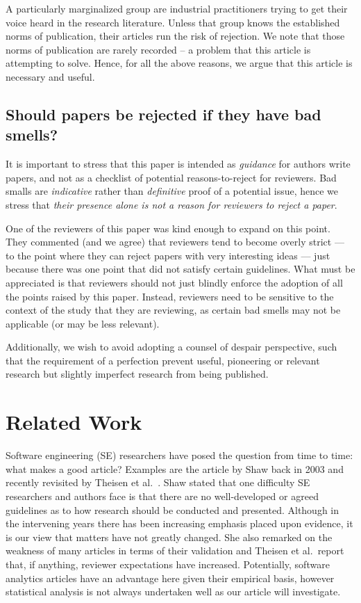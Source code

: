 \documentclass[preprint,10pt]{elsarticle}
\newcommand{\RED}{\color{red}}
\newcommand{\BLACK}{\color{black}}
\begin{document}
A particularly marginalized group are industrial practitioners trying to get their voice heard in the research literature.  Unless that group knows the established norms of publication, their articles run the risk of rejection. We note that those norms of publication are rarely recorded -- a problem that this article is attempting to solve.  Hence, for all the above reasons, we argue that this article is necessary and useful.

\RED \subsection{Should papers be rejected if they have bad smells?}\label{sec:reject}

It is important to stress that this paper is intended as \textit{guidance} for authors  write papers, and not as a checklist of potential reasons-to-reject for reviewers.  Bad smalls are {\em indicative} rather than {\em definitive} proof of a potential issue, hence we stress that {\em their presence alone is not a reason for reviewers to reject a paper}. 

One of the reviewers of this paper was kind enough to expand on this point. They commented (and we agree) that reviewers tend to become overly strict --- to the point where they can reject papers with very interesting ideas --- just because there was one point that did not satisfy certain guidelines.  What must be  appreciated is that reviewers should not just blindly enforce the adoption of all the points raised by this paper. Instead, reviewers need to be sensitive to the context of the study that they are reviewing, as certain bad smells may not be applicable (or may be less relevant).  

Additionally, we wish to avoid adopting a counsel of despair perspective, such that the requirement of a perfection prevent useful, pioneering or relevant research but slightly imperfect research from being published.
\BLACK
 

\section{Related Work}\label{Sec:RelWk}
 
Software engineering (SE) researchers have posed the question from time to time: what makes a good article?  Examples are the article by Shaw \cite{Shaw03} back in 2003 and recently revisited by Theisen et al.~\cite{Thei17}.  Shaw stated that one difficulty SE researchers and authors face is that there are no well-developed or agreed guidelines as to how research should be conducted and presented.  Although in the intervening years there has been increasing emphasis placed upon evidence, it is our view that matters have not greatly changed.  She also remarked on the weakness of many articles in terms of their validation and Theisen et al.\ report that, if anything, reviewer expectations have increased.  Potentially, software analytics articles have an advantage here given their empirical basis, however statistical analysis is not always undertaken well as our article will investigate.
\end{document}
